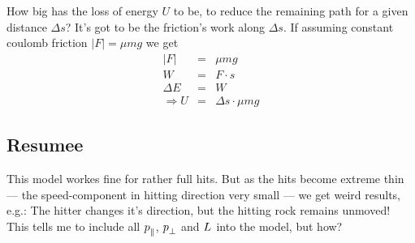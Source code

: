 How big has the loss of energy $ U $ to be, to reduce the remaining path for a
given distance $ \Delta s $? It's got to be the friction's work along $ \Delta
s $. If assuming constant coulomb friction $ |F| = \mu m g $ we get
%
\begin{eqnarray}
|F| &=& \mu m g \\
W   &=& F \cdot s \\
\Delta E &=& W \\
\Longrightarrow
U &=& \Delta s \cdot \mu m g
\end{eqnarray}

\subsection{Resumee\label{lossproblem}}

This model workes fine for rather full hits. But as the hits become extreme
thin --- the speed-component in hitting direction very small --- we get weird
results, e.g.: The hitter changes it's direction, but the hitting rock remains
unmoved! This tells me to include all $  p^\mathrm{}_\parallel  $, $  p^\mathrm{}_\perp  $ and $  L^\mathrm{}  $ into
the model, but how?

